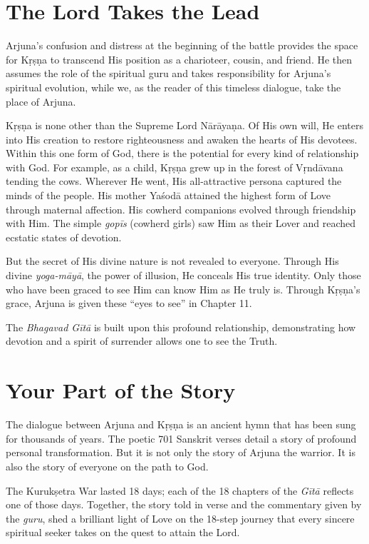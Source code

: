 \section{The Lord Takes the Lead}\label{sec-the-lord-takes-the-lead}

Arjuna’s confusion and distress at the beginning of the battle provides the space for Kṛṣṇa to transcend His position as a charioteer, cousin, and friend. He then assumes the role of the spiritual guru and takes responsibility for Arjuna’s spiritual evolution, while we, as the reader of this timeless dialogue, take the place of Arjuna.

Kṛṣṇa is none other than the Supreme Lord Nārāyaṇa. Of His own will, He enters into His creation to restore righteousness and awaken the hearts of His devotees. Within this one form of God, there is the potential for every kind of relationship with God. For example, as a child, Kṛṣṇa grew up in the forest of Vṛndāvana tending the cows. Wherever He went, His all-attractive persona captured the minds of the people. His mother Yaśodā attained the highest form of Love through maternal affection. His cowherd companions evolved through friendship with Him. The simple \textit{gopīs} (cowherd girls) saw Him as their Lover and reached ecstatic states of devotion.

But the secret of His divine nature is not revealed to everyone. Through His divine \textit{yoga-māyā}, the power of illusion, He conceals His true identity. Only those who have been graced to see Him can know Him as He truly is. Through Kṛṣṇa’s grace, Arjuna is given these \enquote{eyes to see} in Chapter 11. 

The \textit{Bhagavad Gītā} is built upon this profound relationship, demonstrating how devotion and a spirit of surrender allows one to see the Truth.

\section{Your Part of the Story}\label{sec-your-part-of-the-story}
The dialogue between Arjuna and Kṛṣṇa is an ancient hymn that has been sung for thousands of years. The poetic 701 Sanskrit verses detail a story of profound personal transformation. But it is not only the story of Arjuna the warrior. It is also the story of everyone on the path to God.

The Kurukṣetra War lasted 18 days; each of the 18 chapters of the \textit{Gītā} reflects one of those days. Together, the story told in verse and the commentary given by the \textit{guru}, shed a brilliant light of Love on the 18-step journey that every sincere spiritual seeker takes on the quest to attain the Lord.

